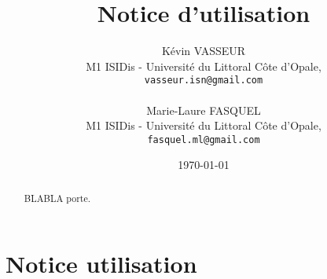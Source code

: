 \documentclass{article}
\title{Notice d'utilisation}
\author{K\'{e}vin VASSEUR\\
   M1 ISIDis - Universit\'{e} du Littoral C\^{o}te d'Opale,\\
   \texttt{vasseur.isn@gmail.com}\\
   \\
   Marie-Laure FASQUEL\\
   M1 ISIDis - Universit\'{e} du Littoral C\^{o}te d'Opale,\\
   \texttt{fasquel.ml@gmail.com}
}
\date{\today}
\begin{document}
	\maketitle
	\begin{abstract}
		BLABLA porte.
	\end{abstract}	
	
	\tableofcontents
	
	\section{Notice utilisation}
	
\end{document}
